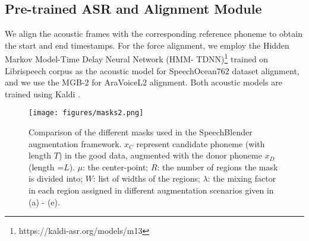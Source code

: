\documentclass{INTERSPEECH2023}
\begin{document}
\subsection{Pre-trained ASR and Alignment Module}
\label{ssec:asr}
We align the acoustic frames with the corresponding reference phoneme to obtain the start and end timestamps. For the force alignment, 
we employ the Hidden Markov Model-Time Delay Neural Network (HMM- TDNN)\footnote{https://kaldi-asr.org/models/m13} trained on Librispeech corpus as the acoustic model for SpeechOcean762 dataset alignment, and we use the MGB-2 \cite{ali2016mgb} for AraVoiceL2 alignment. Both acoustic models are trained using Kaldi \cite{kaldi}. 





\begin{figure*} [!ht]
\centering
\vspace{-0.4cm}
\texttt{[image: figures/masks2.png]}
\vspace{-0.5cm}
\caption{Comparison of the different masks used in the SpeechBlender augmentation framework. $x_C$ represent candidate phoneme (with length $T$) in the good data, augmented with the donor phoneme $x_D$ (length =$L$). 
$\mu$: the center-point; $R$: the number of regions the mask is divided into; $W$: list of widths of the regions; $\lambda$: the mixing factor in each region assigned in different augmentation scenarios given in (a) - (e). }
\label{fig:mask_types}
\vspace{-0.2cm}
\end{figure*}
\end{document}
